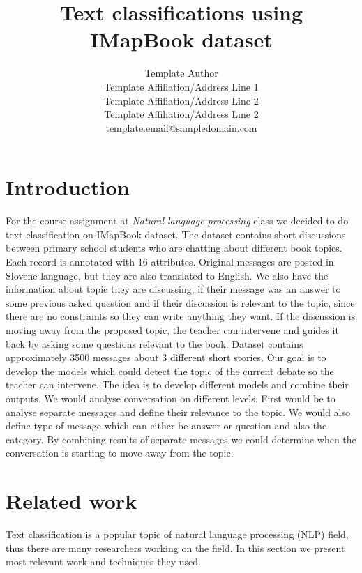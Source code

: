 \documentclass[11pt,a4paper]{article}
\title{Text classifications using IMapBook dataset}
\author{
 Template Author\Thanks{The {\em actual} contributors to this instruction
 document and corresponding template file are given in Section
 \ref{sec:contributors}.} \\
 Template Affiliation/Address Line 1 \\
 Template Affiliation/Address Line 2 \\
 Template Affiliation/Address Line 2 \\
  {\sf template.email@sampledomain.com} \\
}
\date{}
\newcommand{\taclpaper}{final version\xspace}
\newcommand{\taclpapers}{final versions\xspace}
\newcommand{\taclpaper}{submission\xspace}
\newcommand{\taclpapers}{{\taclpaper}s\xspace}
\begin{document}
\maketitle


\section{Introduction}
For the course assignment at \textit{Natural language processing} class we decided to do text classification on IMapBook dataset.
The dataset contains short discussions between primary school students who are chatting about different book topics.
Each record is annotated with 16 attributes.
Original messages are posted in Slovene language, but they are also translated to English.
We also have the information about topic they are discussing, if their message was an answer to some previous asked question and if their discussion is relevant to the topic, since there are no constraints so they can write anything they want.
If the discussion is moving away from the proposed topic, the teacher can intervene and guides it back by asking some questions relevant to the book.
Dataset contains approximately 3500 messages about 3 different short stories.
Our goal is to develop the models which could detect the topic of the current debate so the teacher can intervene.
The idea is to develop different models and combine their outputs.
We would analyse conversation on different levels.
First would be to analyse separate messages and define their relevance to the topic.
We would also define type of message which can either be answer or question and also the category.
By combining results of separate messages we could determine when the conversation is starting to move away from the topic.

\section{Related work}
Text classification is a popular topic of natural language processing (NLP) field, thus there are many researchers working on the field. In this section we present most relevant work and techniques they used.
\end{document}
